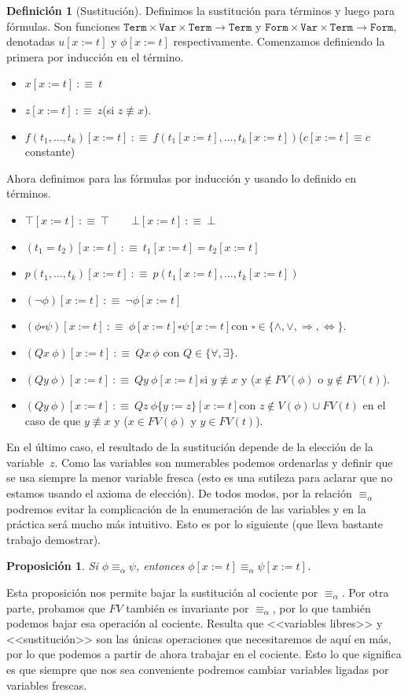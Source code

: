 \documentclass[a4paper, 12pt]{report}
\newcommand{\Ra}{\Rightarrow}
\newcommand{\Lra}{\Leftrightarrow}
\newtheorem{prop}[teorema]{Proposición}
\theoremstyle{definition}
\newtheorem{definicion}[teorema]{Definición}
\begin{document}
\begin{definicion}[Sustitución]
	Definimos la sustitución para términos y luego para fórmulas. Son funciones $\mathtt{Term}\times\mathtt{Var}\times\mathtt{Term}\to\mathtt{Term}$ y $\mathtt{Form}\times\mathtt{Var}\times\mathtt{Term}\to\mathtt{Form}$, denotadas $u[x:=t]$ y $\phi[x:=t]$ respectivamente. Comenzamos definiendo la primera por inducción en el término.
	\begin{itemize}
		\item $x[x:=t] ~:\equiv~ t$
		\item $z[x:=t] ~:\equiv~ z$\quad(si $z\not\equiv x$).
		\item $f(t_1,\dots,t_k)[x:=t]~:\equiv~f(t_1[x:=t],\dots,t_k[x:=t])$\quad ($c[x:=t]\equiv c$ constante)
	\end{itemize}
	Ahora definimos para las fórmulas por inducción y usando lo definido en términos.
	\begin{itemize}
		\item $\top[x:=t]~:\equiv~\top\qquad \bot[x:=t]~:\equiv~\bot$
		\item $(t_1=t_2)[x:=t]~:\equiv~ t_1[x:=t]=t_2[x:=t]$
		\item $p(t_1,\dots,t_k)[x:=t]~:\equiv~p(t_1[x:=t],\dots,t_k[x:=t])$
		\item $(\lnot\phi)[x:=t]~:\equiv~\lnot\phi[x:=t]$
		\item $(\phi\square\psi)[x:=t]~:\equiv~\phi[x:=t]\square\psi[x:=t]$\quad con $\square\in\{\wedge,\vee,\Ra,\Lra\}$.
		\item $(Qx~\phi)[x:=t]~:\equiv~Qx~\phi$ \quad con $Q\in\{\forall,\exists\}$.
		\item $(Qy~\phi)[x:=t]~:\equiv~Qy~\phi[x:=t]$\quad si $y\not\equiv x$ y ($x\not\in FV(\phi)$ o $y\not\in FV(t)$).
		\item $(Qy~\phi)[x:=t]~:\equiv~Qz~\phi\{y:=z\}[x:=t]$\quad con $z\not\in V(\phi)\cup FV(t)$ \quad en el caso de que $y\not\equiv x$ y ($x\in FV(\phi)$ y $y\in FV(t)$).
	\end{itemize}
\end{definicion}

En el último caso, el resultado de la sustitución depende de la elección de la variable~$z$. Como las variables son numerables podemos ordenarlas y definir que se usa siempre la menor variable fresca (esto es una sutileza para aclarar que no estamos usando el axioma de elección). De todos modos, por la relación $\equiv_\alpha$ podremos evitar la complicación de la enumeración de las variables y en la práctica será mucho más intuitivo. Esto es por lo siguiente (que lleva bastante trabajo demostrar).
\begin{prop}
	Si $\phi\equiv_\alpha\psi$, entonces $\phi[x:=t]\equiv_\alpha\psi[x:=t]$.
\end{prop}
Esta proposición nos permite bajar la sustitución al cociente por $\equiv_\alpha$. Por otra parte, probamos que $FV$ también es invariante por $\equiv_\alpha$, por lo que también podemos bajar esa operación al cociente. Resulta que <<variables libres>> y <<sustitución>> son las únicas operaciones que necesitaremos de aquí en más, por lo que podemos a partir de ahora trabajar en el cociente. Esto lo que significa es que siempre que nos sea conveniente podremos cambiar variables ligadas por variables frescas.
\end{document}
